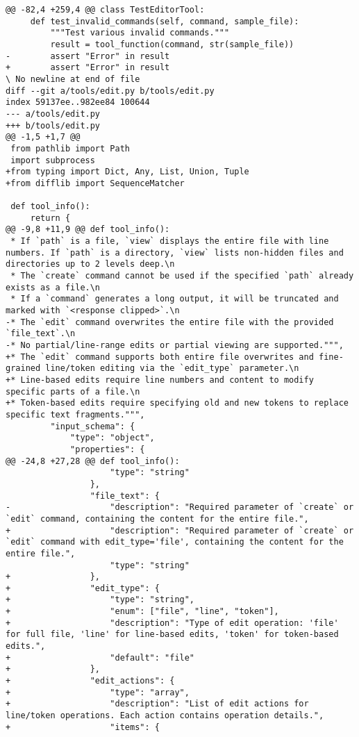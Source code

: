\begin{lstlisting}[style=diffstyle]
@@ -82,4 +259,4 @@ class TestEditorTool:
     def test_invalid_commands(self, command, sample_file):
         """Test various invalid commands."""
         result = tool_function(command, str(sample_file))
-        assert "Error" in result
+        assert "Error" in result
\ No newline at end of file
diff --git a/tools/edit.py b/tools/edit.py
index 59137ee..982ee84 100644
--- a/tools/edit.py
+++ b/tools/edit.py
@@ -1,5 +1,7 @@
 from pathlib import Path
 import subprocess
+from typing import Dict, Any, List, Union, Tuple
+from difflib import SequenceMatcher
 
 def tool_info():
     return {
@@ -9,8 +11,9 @@ def tool_info():
 * If `path` is a file, `view` displays the entire file with line numbers. If `path` is a directory, `view` lists non-hidden files and directories up to 2 levels deep.\n
 * The `create` command cannot be used if the specified `path` already exists as a file.\n
 * If a `command` generates a long output, it will be truncated and marked with `<response clipped>`.\n
-* The `edit` command overwrites the entire file with the provided `file_text`.\n
-* No partial/line-range edits or partial viewing are supported.""",
+* The `edit` command supports both entire file overwrites and fine-grained line/token editing via the `edit_type` parameter.\n
+* Line-based edits require line numbers and content to modify specific parts of a file.\n
+* Token-based edits require specifying old and new tokens to replace specific text fragments.""",
         "input_schema": {
             "type": "object",
             "properties": {
@@ -24,8 +27,28 @@ def tool_info():
                     "type": "string"
                 },
                 "file_text": {
-                    "description": "Required parameter of `create` or `edit` command, containing the content for the entire file.",
+                    "description": "Required parameter of `create` or `edit` command with edit_type='file', containing the content for the entire file.",
                     "type": "string"
+                },
+                "edit_type": {
+                    "type": "string",
+                    "enum": ["file", "line", "token"],
+                    "description": "Type of edit operation: 'file' for full file, 'line' for line-based edits, 'token' for token-based edits.",
+                    "default": "file"
+                },
+                "edit_actions": {
+                    "type": "array",
+                    "description": "List of edit actions for line/token operations. Each action contains operation details.",
+                    "items": {

\end{lstlisting}
